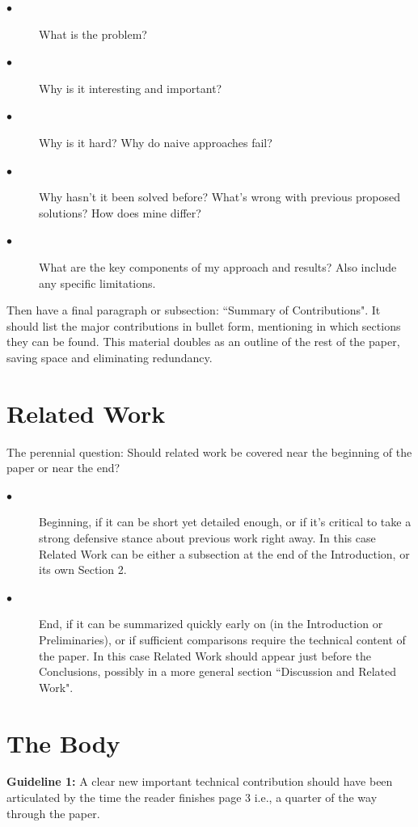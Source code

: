 \documentclass[10pt,twocolumn]{article}
\begin{document}
\begin{description}
  \item[$\bullet$]  What is the problem?
  \item[$\bullet$]  Why is it interesting and important?
  \item[$\bullet$]  Why is it hard? Why do naive approaches fail?
  \item[$\bullet$]  Why hasn't it been solved before? What's wrong with previous proposed solutions? How does mine differ?
  \item[$\bullet$]  What are the key components of my approach and results? Also include any specific limitations.
\end{description}
  
Then have a final paragraph or subsection: ``Summary of Contributions". It should list the major contributions in bullet form, mentioning in which sections they can be found. This material doubles as an outline of the rest of the paper, saving space and eliminating redundancy.

\section{Related Work}

The perennial question: Should related work be covered near the beginning of the paper or near the end?

\begin{description}
  \item[$\bullet$]  Beginning, if it can be short yet detailed enough, or if it's critical to take a strong defensive stance about previous work right away. In this case Related Work can be either a subsection at the end of the Introduction, or its own Section 2.
  \item[$\bullet$]  End, if it can be summarized quickly early on (in the Introduction or Preliminaries), or if sufficient comparisons require the technical content of the paper. In this case Related Work should appear just before the Conclusions, possibly in a more general section ``Discussion and Related Work".
\end{description}

\section{The Body}

\textbf{Guideline 1:} A clear new important technical contribution should have been articulated by the time the reader finishes page 3 i.e., a quarter of the way through the paper.
\end{document}
